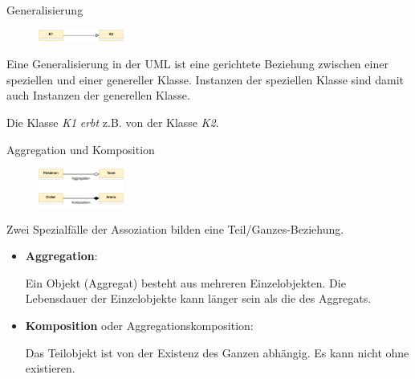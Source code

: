 \begin{defi}{Generalisierung}
    \begin{figure}
        \centering
        \includegraphics[width=0.25\textwidth]{includes/figures/defi_diagrams_class_vererbung.pdf}
    \end{figure}
    Eine Generalisierung in der UML ist eine gerichtete Beziehung zwischen einer speziellen und einer genereller Klasse.
    Instanzen der speziellen Klasse sind damit auch Instanzen der generellen Klasse.

    Die Klasse \emph{K1} \emph{erbt} z.B. von der Klasse \emph{K2}.
\end{defi}

\begin{defi}{Aggregation und Komposition}
    \begin{figure}
        \centering
        \includegraphics[width=0.25\textwidth]{includes/figures/defi_diagrams_class_aggregation_composition.pdf}
    \end{figure}
    Zwei Spezialfälle der Assoziation bilden eine Teil/Ganzes-Beziehung.

    \begin{itemize}
        \item \textbf{Aggregation}:

              Ein Objekt (Aggregat) besteht aus mehreren Einzelobjekten.
              Die Lebensdauer der Einzelobjekte kann länger sein als die des Aggregats.
        \item \textbf{Komposition} oder Aggregationskomposition:

              Das Teilobjekt ist von der Existenz des Ganzen abhängig.
              Es kann nicht ohne existieren.
    \end{itemize}
\end{defi}